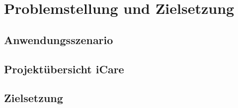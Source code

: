 \section{Problemstellung und Zielsetzung}\label{sec:definitionen}

\subsection{Anwendungsszenario}

\subsection{Projektübersicht iCare}

\subsection{Zielsetzung}

